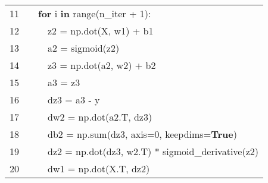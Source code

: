 \documentclass[preprint,12pt]{elsarticle}
\begin{document}
\begin{table}[ht]
{\begin{tabular}{|r l l l l|}
            \rowcolor{regularback} \cellcolor{linenumberback} \textcolor{grayhighlight}{11} & & \multicolumn{3}{l|}{\textcolor{codegreen}{\textbf{for}} i \textcolor{codepurple}{\textbf{in}} range(n\_iter \textcolor{grayhighlight}{+} 1):} \\
            \rowcolor{regularback} \cellcolor{linenumberback} \textcolor{grayhighlight}{12} & & & \multicolumn{2}{l|}{z2 \textcolor{grayhighlight}{=} np\textcolor{grayhighlight}{.}dot(X, w1) \textcolor{grayhighlight}{+} b1} \\
            \rowcolor{regularback} \cellcolor{linenumberback} \textcolor{grayhighlight}{13} & & & \multicolumn{2}{l|}{a2 \textcolor{grayhighlight}{=} sigmoid(z2)} \\
            \rowcolor{regularback} \cellcolor{linenumberback} \textcolor{grayhighlight}{14} & & & \multicolumn{2}{l|}{z3 \textcolor{grayhighlight}{=} np\textcolor{grayhighlight}{.}dot(a2, w2) \textcolor{grayhighlight}{+} b2} \\
            \rowcolor{regularback} \cellcolor{linenumberback} \textcolor{grayhighlight}{15} & & & \multicolumn{2}{l|}{a3 \textcolor{grayhighlight}{=} z3} \\
            \rowcolor{regularback} \cellcolor{linenumberback} \textcolor{grayhighlight}{16} & & & \multicolumn{2}{l|}{dz3 \textcolor{grayhighlight}{=} a3 \textcolor{grayhighlight}{-} y} \\
            \rowcolor{regularback} \cellcolor{linenumberback} \textcolor{grayhighlight}{17} & & & \multicolumn{2}{l|}{dw2 \textcolor{grayhighlight}{=} np\textcolor{grayhighlight}{.}dot(a2\textcolor{grayhighlight}{.}T, dz3)} \\
            \rowcolor{regularback} \cellcolor{linenumberback} \textcolor{grayhighlight}{18} & & & \multicolumn{2}{l|}{db2 \textcolor{grayhighlight}{=} np\textcolor{grayhighlight}{.}sum(dz3, axis\textcolor{grayhighlight}{=0}, keepdims\textcolor{grayhighlight}{=}\textcolor{codegreen}{\textbf{True}})} \\
            \rowcolor{regularback} \cellcolor{linenumberback} \textcolor{grayhighlight}{19} & & & \multicolumn{2}{l|}{dz2 \textcolor{grayhighlight}{=} np\textcolor{grayhighlight}{.}dot(dz3, w2\textcolor{grayhighlight}{.}T) \textcolor{grayhighlight}{*} sigmoid\_derivative(z2)} \\
            \rowcolor{regularback} \cellcolor{linenumberback} \textcolor{grayhighlight}{20} & & & \multicolumn{2}{l|}{dw1 \textcolor{grayhighlight}{=} np\textcolor{grayhighlight}{.}dot(X\textcolor{grayhighlight}{.}T, dz2)} \\

\end{tabular}}
\end{table}
\end{document}
